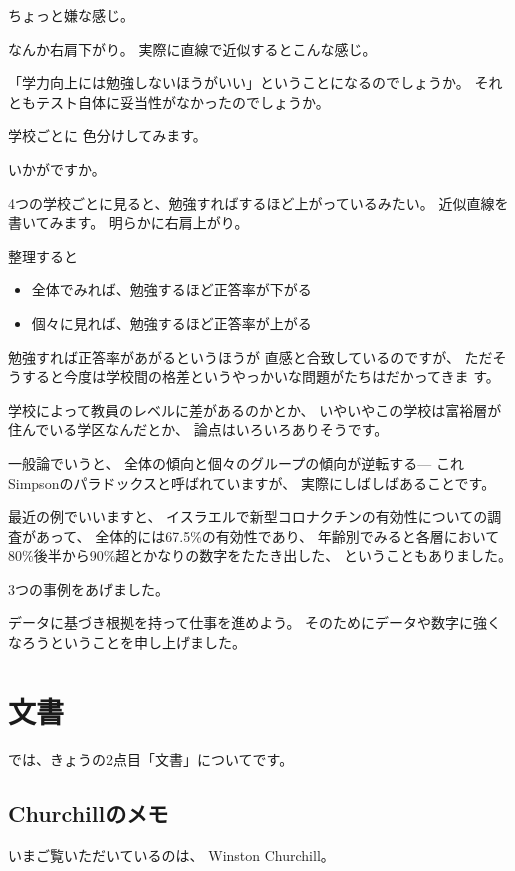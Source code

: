 \documentclass[uplatex,jis2004,dvipdfmx,14pt]{jsarticle}
\begin{document}
ちょっと嫌な感じ。

なんか右肩下がり。
実際に直線で近似するとこんな感じ。

「学力向上には勉強しないほうがいい」ということになるのでしょうか。
それともテスト自体に妥当性がなかったのでしょうか。

学校ごとに
色分けしてみます。

いかがですか。

4つの学校ごとに見ると、勉強すればするほど上がっているみたい。
近似直線を書いてみます。
明らかに右肩上がり。

整理すると
\begin{itemize}[itemsep=5pt]
 \item 全体でみれば、勉強するほど正答率が下がる
 \item 個々に見れば、勉強するほど正答率が上がる
\end{itemize}

勉強すれば正答率があがるというほうが
直感と合致しているのですが、
ただそうすると今度は学校間の格差というやっかいな問題がたちはだかってきま
す。

学校によって教員のレベルに差があるのかとか、
いやいやこの学校は富裕層が住んでいる学区なんだとか、
論点はいろいろありそうです。


一般論でいうと、
全体の傾向と個々のグループの傾向が逆転する---
これSimpsonのパラドックスと呼ばれていますが、
実際にしばしばあることです。

最近の例でいいますと、
イスラエルで新型コロナクチンの有効性についての調査があって、
全体的には67.5\%の有効性であり、
年齢別でみると各層において80\%後半から90\%超とかなりの数字をたたき出した、
ということもありました。


3つの事例をあげました。

データに基づき根拠を持って仕事を進めよう。
そのためにデータや数字に強くなろうということを申し上げました。

\newpage

\section{文書}

では、きょうの2点目「文書」についてです。

\subsection{Churchillのメモ}

いまご覧いただいているのは、
Winston Churchill。
\end{document}
